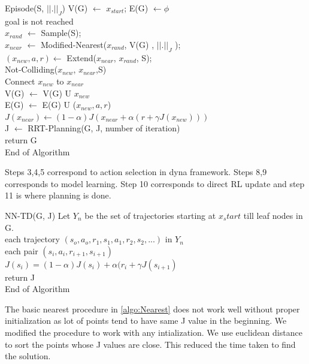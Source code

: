 \documentclass[MTech]{iitmdiss}
\begin{document}
\begin{algorithm}{Episode(S, $|| . ||_J$)}{
\label{algo:Dyna-Episode}
}
 V(G) $\leftarrow$ {$x_{start}$};  E(G) $\leftarrow${$\phi$ } \\
\qwhile goal is not reached \\
$x_{rand}$ $\leftarrow$ Sample(S);\\
$x_{near}$ $\leftarrow$ Modified-Nearest($x_{rand}$, V(G) , $|| . ||_J $ );\\
$(x_{new}, a, r) \leftarrow$ Extend($x_{near}$, $x_{rand}$, S);\\
\qif Not-Colliding($x_{new}$, $x_{near}$,S)\\
\qthen Connect $x_{new}$ to $x_{near}$\\
V(G) $\leftarrow$ V(G) U {$ x_{new}$ }\\
E(G) $\leftarrow$ E(G) U ($x_{new}, a, r$)\\
$J(x_{near}) \leftarrow (1 - \alpha) J (x_{near} + \alpha (r + \gamma J(x_{new})))$ \qfi\\
J $\leftarrow$ RRT-Planning(G, J, number of iteration)\qend\\
return G\qend\\
End of Algorithm
\end{algorithm}
Steps 3,4,5 correspond to action selection in dyna framework. Steps 8,9 corresponds to model learning. Step 10 corresponds to direct RL update and step 11 is where planning is done. 

\begin{algorithm}{NN-TD(G, J)}{
\label{algo:NN-TD}
}
Let $Y_n$ be the set of trajectories starting at $x_start$ till leaf nodes in G.\\
\qfor each trajectory $(s_o, a_o, r_1, s_1, a_1, r_2, s_2, ...)$ in $Y_n$\\
\qfor each pair $(s_i,a_i,r_{i+1}, s_{i+1})$\\
$J(s_i) = (1 - \alpha) J(s_i) + \alpha(r_i + \gamma J(s_{i+1})$\qrof\qrof\\
return J\\
End of Algorithm
\end{algorithm}

The basic nearest procedure in \ref{algo:Nearest} does not work well without proper initialization as lot of points tend to have same J value in the beginning. We modified the procedure to work with any intialization. We use euclidean distance to sort the points whose J values are close. This reduced the time taken to find the solution.
\end{document}

